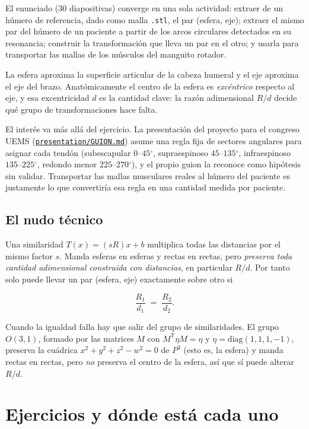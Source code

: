 \documentclass[11pt,a4paper]{article}
\providecommand{\degree}{\ensuremath{^\circ}}
\newcommand{\ghrepo}{https://github.com/gustavop-dev/humerous-detection-fat-supress}
\newcommand{\ghbranch}{geometry-exercises}
\newcommand{\ghblob}{\ghrepo/blob/\ghbranch}
\newcommand{\ghl}[2]{\href{\ghblob/#1}{#2}}
\newcommand{\Rd}{\ensuremath{R/d}}
\newcommand{\Ot}{\ensuremath{O(3,1)}}
\begin{document}
El enunciado (30 diapositivas) converge en una sola actividad: extraer de un húmero de
referencia, dado como malla \texttt{.stl}, el par (esfera, eje); extraer el mismo par del
húmero de un paciente a partir de los arcos circulares detectados en su resonancia;
construir la transformación que lleva un par en el otro; y usarla para transportar las
mallas de los músculos del manguito rotador.

La esfera aproxima la superficie articular de la cabeza humeral y el eje aproxima el eje
del brazo. Anatómicamente el centro de la esfera es \emph{excéntrico} respecto al eje, y esa
excentricidad $d$ es la cantidad clave: la razón adimensional \Rd{} decide qué grupo de
transformaciones hace falta.

El interés va más allá del ejercicio. La presentación del proyecto para el congreso UEMS
(\ghl{presentation/GUION.md}{\texttt{presentation/GUION.md}}) asume una regla fija de
sectores angulares para asignar cada tendón (subescapular $0$--$45\degree$, supraespinoso
$45$--$135\degree$, infraespinoso $135$--$225\degree$, redondo menor
$225$--$270\degree$), y el propio guion la reconoce como hipótesis sin validar.
Transportar las mallas musculares reales al húmero del paciente es justamente lo que
convertiría esa regla en una cantidad medida por paciente.

\subsection{El nudo técnico}

Una similaridad $T(x) = (sR)x + b$ multiplica todas las distancias por el mismo factor $s$.
Manda esferas en esferas y rectas en rectas, pero \emph{preserva toda cantidad adimensional
construida con distancias}, en particular \Rd. Por tanto solo puede llevar un par
(esfera, eje) exactamente sobre otro si

\[
\frac{R_1}{d_1} \;=\; \frac{R_2}{d_2}.
\]

Cuando la igualdad falla hay que salir del grupo de similaridades. El grupo \Ot{}, formado
por las matrices $M$ con $M^{\mathsf T} \eta M = \eta$ y $\eta = \mathrm{diag}(1,1,1,-1)$, preserva la
cuádrica $x^2+y^2+z^2-w^2=0$ de $P^3$ (esto es, la esfera) y manda rectas en rectas, pero
\emph{no} preserva el centro de la esfera, así que sí puede alterar \Rd.

\section{Ejercicios y dónde está cada uno}
\end{document}
